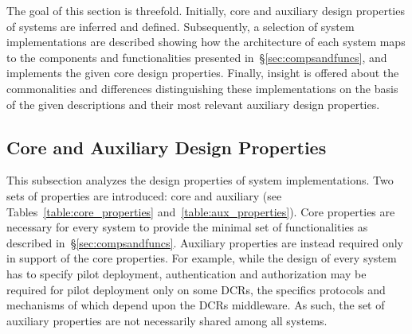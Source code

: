 \documentclass{sig-alternate}
\begin{document}

The goal of this section is threefold. Initially, core and auxiliary design
properties of \pilot systems are inferred and defined. Subsequently, a selection
of \pilot system implementations are described showing how the architecture of
each system maps to the components and functionalities presented
in~\S\ref{sec:compsandfuncs}, and implements the given core design properties.
Finally, insight is offered about the commonalities and differences
distinguishing these implementations on the basis of the given descriptions and
their most relevant auxiliary design properties.


 

%
\subsection{Core and Auxiliary Design Properties}
\label{sec:properties}

This subsection analyzes the design properties of \pilot system implementations.
Two sets of properties are introduced: core and auxiliary (see
Tables~\ref{table:core_properties} and~\ref{table:aux_properties}). Core
properties are necessary for every \pilot system to provide the minimal set of
functionalities as described in~\S\ref{sec:compsandfuncs}. Auxiliary properties
are instead required only in support of the core properties. For example, while
the design of every \pilot system has to specify pilot deployment,
authentication and authorization may be required for pilot deployment only on
some DCRs, the specifics protocols and mechanisms of which depend upon the DCRs
middleware. As such, the set of auxiliary properties are not necessarily shared
among all \pilot systems.

\end{document}
